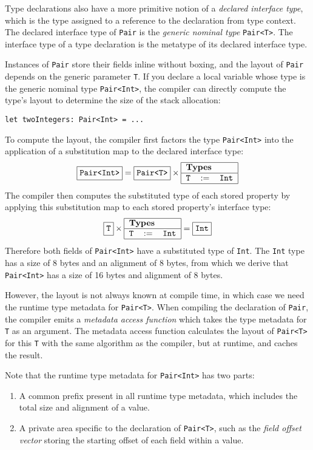 \documentclass[a4paper,headsepline,bibliography=totoc,toc=flat,fleqn,twoside=semi]{scrbook}
\theoremstyle{definition}
\theoremstyle{definition}
\theoremstyle{definition}
\newcommand{\ttbox}[1]{\boxed{\mbox{\vphantom{pI\texttt{pI}}\texttt{#1}}}}
\newcommand{\SubMap}[1]{\begin{tabular}{|lll|}
\hline
\multicolumn{3}{|l|}{\textbf{Types}}\\
\hline
#1\\
\hline
\end{tabular}}
\newcommand{\SubType}[2]{\texttt{#1}&$:=$&\texttt{#2}}
\begin{document}
Type declarations also have a more primitive notion of a \emph{declared interface type}, which is the type assigned to a reference to the declaration from type context. The declared interface type of \texttt{Pair} is the \emph{generic nominal type} \texttt{Pair<T>}. The interface type of a type declaration is the metatype of its declared interface type.

Instances of \texttt{Pair} store their fields inline without boxing, and the layout of \texttt{Pair} depends on the generic parameter \texttt{T}. If you declare a local variable whose type is the generic nominal type \texttt{Pair<Int>}, the compiler can directly compute the type's layout to determine the size of the stack allocation:
\begin{Verbatim}
let twoIntegers: Pair<Int> = ...
\end{Verbatim}
To compute the layout, the compiler first factors the type \texttt{Pair<Int>} into the application of a substitution map to the declared interface type:
\[\ttbox{Pair<Int>} = \ttbox{Pair<T>} \times \SubMap{\SubType{T}{Int}}\]
The compiler then computes the substituted type of each stored property by applying this substitution map to each stored property's interface type:
\[\ttbox{T} \times \SubMap{\SubType{T}{Int}} = \ttbox{Int}\]
Therefore both fields of \texttt{Pair<Int>} have a substituted type of \texttt{Int}. The \texttt{Int} type has a size of 8 bytes and an alignment of 8 bytes, from which we derive that \texttt{Pair<Int>} has a size of 16 bytes and alignment of 8 bytes.

However, the layout is not always known at compile time, in which case we need the runtime type metadata for \texttt{Pair<T>}. When compiling the declaration of \texttt{Pair}, the compiler emits a \emph{metadata access function} which takes the type metadata for \texttt{T} as an argument. The metadata access function calculates the layout of \texttt{Pair<T>} for this \texttt{T} with the same algorithm as the compiler, but at runtime, and caches the result.

Note that the runtime type metadata for \texttt{Pair<Int>} has two parts:
\begin{enumerate}
\item A common prefix present in all runtime type metadata, which includes the total size and alignment of a value.
\item A private area specific to the declaration of \texttt{Pair<T>}, such as the \emph{field offset vector} storing the starting offset of each field within a value.
\end{enumerate}
\end{document}
